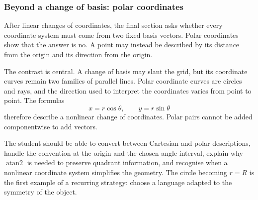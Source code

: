 \subsubsection*{Beyond a change of basis: polar coordinates}

After linear changes of coordinates, the final section asks whether every
coordinate system must come from two fixed basis vectors. Polar coordinates show
that the answer is no. A point may instead be described by its distance from the
origin and its direction from the origin.

The contrast is central. A change of basis may slant the grid, but its coordinate
curves remain two families of parallel lines. Polar coordinate curves are circles
and rays, and the direction used to interpret the coordinates varies from point
to point. The formulas
\[
x=r\cos\theta,
\qquad
y=r\sin\theta
\]
therefore describe a nonlinear change of coordinates. Polar pairs cannot be added
componentwise to add vectors.

The student should be able to convert between Cartesian and polar descriptions,
handle the convention at the origin and the chosen angle interval, explain why
$\operatorname{atan2}$ is needed to preserve quadrant information, and recognise
when a nonlinear coordinate system simplifies the geometry. The circle becoming
$r=R$ is the first example of a recurring strategy: choose a language adapted to
the symmetry of the object.
